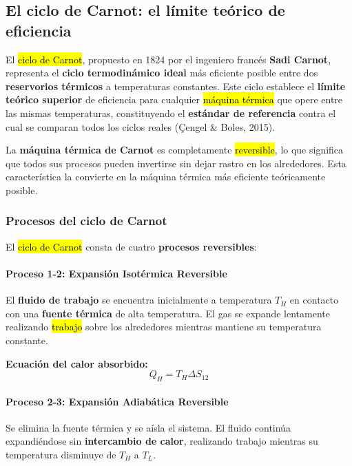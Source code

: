 \documentclass{article}
\begin{document}
    \subsection{El ciclo de Carnot: el límite teórico de eficiencia}

    El \hl{ciclo de Carnot}, propuesto en 1824 por el ingeniero francés \textbf{Sadi Carnot}, representa el \textbf{ciclo termodinámico ideal} más eficiente posible entre dos \textbf{reservorios térmicos} a temperaturas constantes. Este ciclo establece el \textbf{límite teórico superior} de eficiencia para cualquier \hl{máquina térmica} que opere entre las mismas temperaturas, constituyendo el \textbf{estándar de referencia} contra el cual se comparan todos los ciclos reales (Çengel \& Boles, 2015).

    La \textbf{máquina térmica de Carnot} es completamente \hl{reversible}, lo que significa que todos sus procesos pueden invertirse sin dejar rastro en los alrededores. Esta característica la convierte en la máquina térmica más eficiente teóricamente posible.

    \subsubsection{Procesos del ciclo de Carnot}

    El \hl{ciclo de Carnot} consta de cuatro \textbf{procesos reversibles}:

    \paragraph{Proceso 1-2: Expansión Isotérmica Reversible}
    El \textbf{fluido de trabajo} se encuentra inicialmente a temperatura $T_H$ en contacto con una \textbf{fuente térmica} de alta temperatura. El gas se expande lentamente realizando \hl{trabajo} sobre los alrededores mientras mantiene su temperatura constante.

    \textbf{Ecuación del calor absorbido:}
    \begin{equation}
    Q_H = T_H \Delta S_{12}
    \end{equation}

    \paragraph{Proceso 2-3: Expansión Adiabática Reversible}
    Se elimina la fuente térmica y se aísla el sistema. El fluido continúa expandiéndose sin \textbf{intercambio de calor}, realizando trabajo mientras su temperatura disminuye de $T_H$ a $T_L$.
\end{document}
